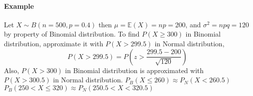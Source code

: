 \documentclass{article}
\begin{document}
		\paragraph{Example} Let $X \sim B(n=500, p=0.4)$ then $\mu = \mathbb{E}(X) = np = 200$, and $\sigma^2 = npq = 120$ by property of Binomial distribution.
		\newline
		To find $P(X \geq 300)$ in Binomial distribution, approximate it with $P(X > 299.5)$ in Normal distribution, 
		\[
			P(X > 299.5) = P(z > \frac{299.5 - 200}{\sqrt{120}})
		\]
		Also, $P(X > 300)$ in Binomial distribution is approximated with $P(X > 300.5)$ in Normal distribution.
		\newline
		$P_B(X \leq 260) \approx P_N(X < 260.5)$
		\newline
		$P_B(250 < X \leq 320) \approx P_N(250.5 < X < 320.5)$
\end{document}
